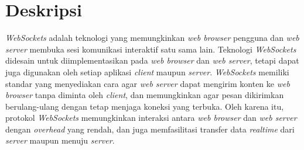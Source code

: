 \documentclass[a4paper,twoside]{article}
\begin{document}
\title{\@judultopik}
\author{\nama \textendash \@npm} 

\newcommand{\nama}{Priambodo Pangestu}
\newcommand{\@npm}{2013730055}
\newcommand{\@judultopik}{Pemanfaatan Smartphone Sebagai Pengendali Permainan Berbasis Web} %
\newcommand{\jumpemb}{1} %
\newcommand{\tanggal}{01/01/1900}
\maketitle


\section{Deskripsi}





\textit{WebSockets} adalah teknologi yang memungkinkan \textit{web browser} pengguna dan \textit{web server} membuka sesi komunikasi interaktif satu sama lain. Teknologi \textit{WebSockets}  didesain untuk diimplementasikan pada \textit{web browser} dan \textit{web server}, tetapi dapat juga digunakan oleh setiap aplikasi \textit{client} maupun \textit{server}. \textit{WebSockets} memiliki standar yang menyediakan cara agar \textit{web server} dapat mengirim konten ke \textit{web browser} tanpa diminta oleh \textit{client}, dan memungkinkan agar pesan dikirimkan berulang-ulang dengan tetap menjaga koneksi yang terbuka. Oleh karena itu, protokol \textit{WebSockets} memungkinkan interaksi antara \textit{web browser} dan \textit{web server} dengan \textit{overhead} yang rendah, dan juga memfasilitasi transfer data \textit{realtime} dari \textit{server} maupun menuju \textit{server}.
\end{document}

